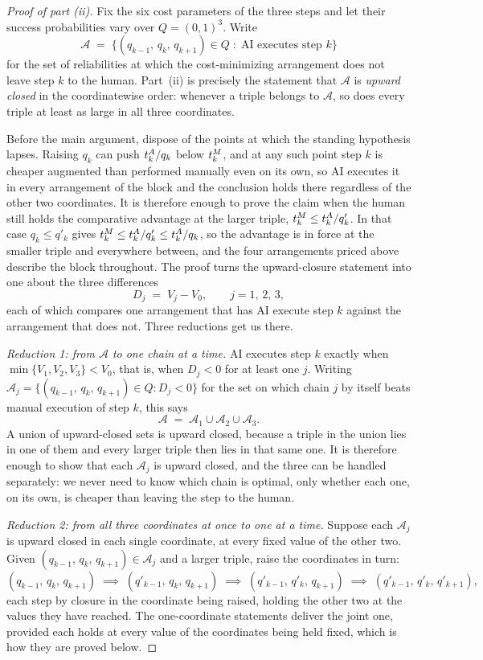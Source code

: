 \begin{proof}[Proof of part (ii)]
Fix the six cost parameters of the three steps and let their success probabilities vary over $Q = (0,1)^3$.
Write
\[ \mathcal{A} \;=\; \bigl\{ (q_{k-1},\, q_k,\, q_{k+1}) \in Q \; : \; \text{AI executes step } k \bigr\} \]
for the set of reliabilities at which the cost-minimizing arrangement does not leave step $k$ to the human.
Part~(ii) is precisely the statement that $\mathcal{A}$ is \emph{upward closed} in the coordinatewise order: whenever a triple belongs to $\mathcal{A}$, so does every triple at least as large in all three coordinates.

Before the main argument, dispose of the points at which the standing hypothesis lapses.
Raising $q_k$ can push $t^{A}_{k}/q_k$ below $t^{M}_{k}$, and at any such point step $k$ is cheaper augmented than performed manually even on its own, so AI executes it in every arrangement of the block and the conclusion holds there regardless of the other two coordinates.
It is therefore enough to prove the claim when the human still holds the comparative advantage at the larger triple, $t^{M}_{k} \leq t^{A}_{k}/q'_k$.
In that case $q_k \leq q'_k$ gives $t^{M}_{k} \leq t^{A}_{k}/q'_k \leq t^{A}_{k}/q_k$, so the advantage is in force at the smaller triple and everywhere between, and the four arrangements priced above describe the block throughout.
The proof turns the upward-closure statement into one about the three differences
\[ D_j \;=\; V_j - V_0, \qquad j = 1,\, 2,\, 3, \]
each of which compares one arrangement that has AI execute step $k$ against the arrangement that does not.
Three reductions get us there.

\emph{Reduction 1: from $\mathcal{A}$ to one chain at a time.}
AI executes step $k$ exactly when $\min\{V_1, V_2, V_3\} < V_0$, that is, when $D_j < 0$ for at least one $j$.
Writing $\mathcal{A}_j = \{(q_{k-1},\, q_k,\, q_{k+1}) \in Q : D_j < 0\}$ for the set on which chain $j$ by itself beats manual execution of step $k$, this says
\[ \mathcal{A} \;=\; \mathcal{A}_1 \cup \mathcal{A}_2 \cup \mathcal{A}_3 . \]
A union of upward-closed sets is upward closed, because a triple in the union lies in one of them and every larger triple then lies in that same one.
It is therefore enough to show that each $\mathcal{A}_j$ is upward closed, and the three can be handled separately: we never need to know which chain is optimal, only whether each one, on its own, is cheaper than leaving the step to the human.

\emph{Reduction 2: from all three coordinates at once to one at a time.}
Suppose each $\mathcal{A}_j$ is upward closed in each single coordinate, at every fixed value of the other two.
Given $(q_{k-1},\, q_k,\, q_{k+1}) \in \mathcal{A}_j$ and a larger triple, raise the coordinates in turn:
\[ (q_{k-1},\, q_k,\, q_{k+1}) \;\implies\; (q'_{k-1},\, q_k,\, q_{k+1}) \;\implies\; (q'_{k-1},\, q'_k,\, q_{k+1}) \;\implies\; (q'_{k-1},\, q'_k,\, q'_{k+1}) , \]
each step by closure in the coordinate being raised, holding the other two at the values they have reached.
The one-coordinate statements deliver the joint one, provided each holds at every value of the coordinates being held fixed, which is how they are proved below.


\end{proof}
